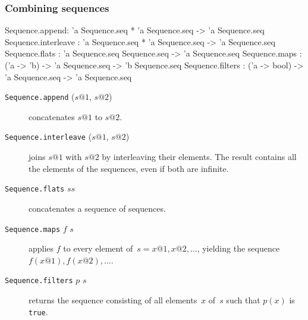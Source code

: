 \subsubsection{Combining sequences}
\begin{ttbox} 
Sequence.append: 'a Sequence.seq * 'a Sequence.seq -> 'a Sequence.seq
Sequence.interleave : 'a Sequence.seq * 'a Sequence.seq
                                                   -> 'a Sequence.seq
Sequence.flats   : 'a Sequence.seq Sequence.seq -> 'a Sequence.seq
Sequence.maps    : ('a -> 'b) -> 'a Sequence.seq -> 'b Sequence.seq
Sequence.filters : ('a -> bool) -> 'a Sequence.seq -> 'a Sequence.seq
\end{ttbox} 
\begin{description}
\item[{\tt Sequence.append} ($s@1$, $s@2$)] 
concatenates $s@1$ to $s@2$.

\item[{\tt Sequence.interleave} ($s@1$, $s@2$)] 
joins $s@1$ with $s@2$ by interleaving their elements.  The result contains
all the elements of the sequences, even if both are infinite.

\item[{\tt Sequence.flats} $ss$] 
concatenates a sequence of sequences.

\item[{\tt Sequence.maps} $f$ $s$] 
applies $f$ to every element of~$s=x@1,x@2,\ldots$, yielding the sequence
$f(x@1),f(x@2),\ldots$.

\item[{\tt Sequence.filters} $p$ $s$] 
returns the sequence consisting of all elements~$x$ of~$s$ such that $p(x)$
is {\tt true}.
\end{description}

